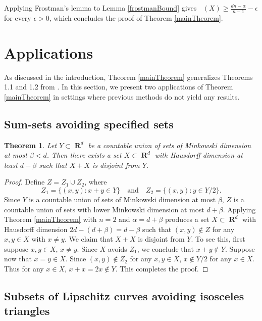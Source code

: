 \documentclass[dvipsnames,letterpaper,12pt]{article}
\numberwithin{equation}{section}
\theoremstyle{plain}
\newtheorem{theorem}{Theorem}
\theoremstyle{remark}
\DeclareMathOperator{\hausdim}{\dim_{\mathbf{H}}}
\DeclareMathOperator{\RR}{\mathbf{R}}
\begin{document}
Applying Frostman's lemma to Lemma \ref{frostmanBound} gives $\hausdim(X) \geq \frac{dn - \alpha}{n - 1} - \epsilon$ for every $\epsilon>0$, which concludes the proof of Theorem \ref{mainTheorem}.









\section{Applications}\label{applications}

As discussed in the introduction, Theorem \ref{mainTheorem} generalizes Theorems 1.1 and 1.2 from \cite{MalabikaRob}. In this section, we present two applications of Theorem \ref{mainTheorem} in settings where previous methods do not yield any results.

\subsection{Sum-sets avoiding specified sets}

\begin{theorem} \label{sumset-application} 
	Let $Y \subset \RR^d$ be a countable union of sets of Minkowski dimension at most $\beta < d$. Then there exists a set $X \subset \RR^d$ with Hausdorff dimension at least $d - \beta$ such that $X + X$ is disjoint from $Y$.
\end{theorem}
\begin{proof}
	Define $Z = Z_1 \cup Z_2$, where
	\[ Z_1 = \{ (x,y) : x + y \in Y \} \quad \text{and} \quad Z_2 = \{ (x,y) : y \in Y/2 \}. \]
	Since $Y$ is a countable union of sets of Minkowski dimension at most $\beta$, $Z$ is a countable union of sets with lower Minkowski dimension at most $d + \beta$. Applying Theorem \ref{mainTheorem} with $n = 2$ and $\alpha = d + \beta$ produces a set $X \subset \RR^d$ with Hausdorff dimension $2d  - (d + \beta) = d - \beta$ such that $(x,y) \not \in Z$ for any $x,y \in X$ with $x \neq y$. We claim that $X+ X$ is disjoint from $Y$. To see this, first suppose $x, y \in X$, $x \ne y$. Since $X$ avoids $Z_1$, we conclude that $x + y \not \in Y$. Suppose now that $x = y \in X$. Since $(x,y) \not \in Z_2$ for any $x,y \in X$, $x \not \in Y/2$ for any $x \in X$. Thus for any $x \in X$, $x + x = 2x \not \in Y$. This completes the proof. 
\end{proof}


\subsection{Subsets of Lipschitz curves avoiding isosceles triangles}
\end{document}
